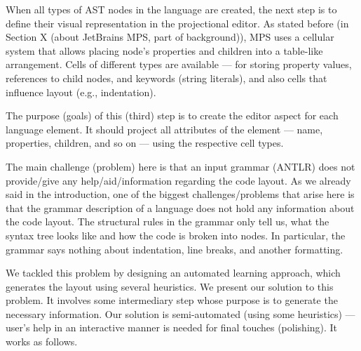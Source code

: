 \documentclass[10pt]{sigplanconf}
\begin{document}
When all types of AST nodes in the language are created, the next step is to define their visual representation in the projectional editor.
As stated before (in Section X (about JetBrains MPS, part of background)), MPS uses a cellular system that allows placing node's properties and children into a table-like arrangement.
Cells of different types are available --- for storing property values, references to child nodes, and keywords (string literals), and also cells that influence layout (e.g., indentation).

The purpose (goals) of this (third) step is to create the editor aspect for each language element.
It should project all attributes of the element --- name, properties, children, and so on --- using the respective cell types.

The main challenge (problem) here is that an input grammar (ANTLR) does not provide/give any help/aid/information regarding the code layout.
As we already said in the introduction, one of the biggest challenges/problems that arise here is that the grammar description of a language does not hold any information about the code layout.
The structural rules in the grammar only tell us, what the syntax tree looks like and how the code is broken into nodes.
In particular, the grammar says nothing about indentation, line breaks, and another formatting.

We tackled this problem by designing an automated learning approach, which generates the layout using several heuristics.
We present our solution to this problem. It involves some intermediary step whose purpose is to generate the necessary information.
Our solution is semi-automated (using some heuristics) --- user's help in an interactive manner is needed for final touches (polishing).
It works as follows.
\end{document}
